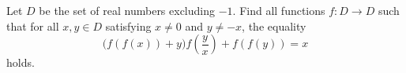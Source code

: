 Let $D$ be the set of real numbers excluding $-1$.
Find all functions $f\colon D\rightarrow D$ such that
for all $x,y\in D$ satisfying $x\neq 0$ and $y\neq -x$, the equality
$$\Big(f(f(x))+y\Big)f\left(\frac{y}{x}\right)+f(f(y)) = x$$
holds.
